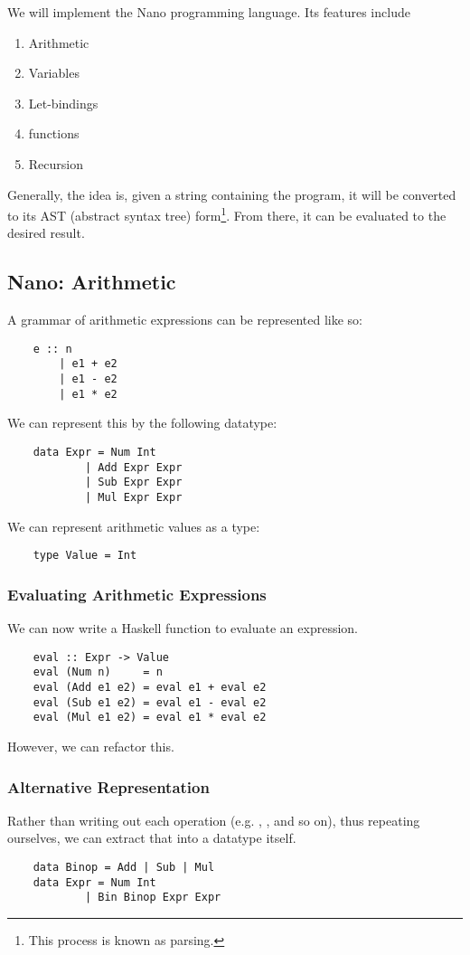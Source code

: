 \documentclass[letterpaper]{article}
\begin{document}
\bigskip 

We will implement the Nano programming language. Its features include
\begin{enumerate}
    \item Arithmetic
    \item Variables
    \item Let-bindings
    \item functions
    \item Recursion
\end{enumerate}
Generally, the idea is, given a string containing the program, it will be converted to its AST (abstract syntax tree) form\footnote{This process is known as parsing.}. From there, it can be evaluated to the desired result. 

\subsection{Nano: Arithmetic}
A grammar of arithmetic expressions can be represented like so: 
\begin{verbatim}
    e :: n 
        | e1 + e2 
        | e1 - e2 
        | e1 * e2\end{verbatim}
We can represent this by the following datatype: 
\begin{verbatim}
    data Expr = Num Int 
            | Add Expr Expr 
            | Sub Expr Expr 
            | Mul Expr Expr\end{verbatim}
We can represent arithmetic values as a type: 
\begin{verbatim}
    type Value = Int \end{verbatim}

\subsubsection{Evaluating Arithmetic Expressions}
We can now write a Haskell function to evaluate an expression. 
\begin{verbatim}
    eval :: Expr -> Value
    eval (Num n)     = n
    eval (Add e1 e2) = eval e1 + eval e2
    eval (Sub e1 e2) = eval e1 - eval e2
    eval (Mul e1 e2) = eval e1 * eval e2\end{verbatim}
However, we can refactor this. 

\subsubsection{Alternative Representation}
Rather than writing out each operation (e.g. , , and so on), thus repeating ourselves, we can extract that into a datatype itself.
\begin{verbatim}
    data Binop = Add | Sub | Mul 
    data Expr = Num Int 
            | Bin Binop Expr Expr \end{verbatim}
\end{document}
